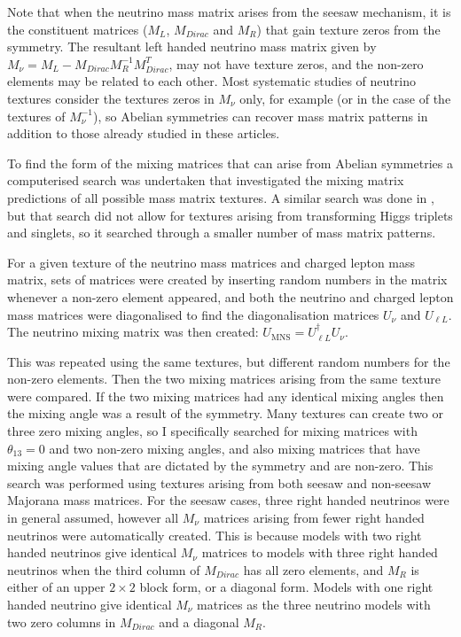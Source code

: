 \documentclass[nofootinbib,showpacs]{revtex4}
\begin{document}
Note that when the neutrino mass matrix arises from the seesaw mechanism, it is the constituent matrices ($M_L$, $M_{Dirac}$ and $M_R$) that gain texture zeros from the symmetry. The resultant left handed neutrino mass matrix given by $M_\nu=M_L-M_{Dirac} M_R^{-1}M_{Dirac}^T$, may not have texture zeros, and the non-zero elements may be related to each other. Most systematic studies of neutrino textures consider the textures zeros in $M_\nu$ only, for example \cite{xingtext1,xingtext2,bandotext1,bandotext2}(or in the case of \cite{lavtext} the textures of $M_\nu^{-1}$), so Abelian symmetries can recover mass matrix patterns in addition to those already studied in these articles. 


To find the form of the mixing matrices that can arise from Abelian symmetries a computerised search was undertaken that investigated the mixing matrix predictions of all possible mass matrix textures. A similar search was done in \cite{nogo2}, but that search did not allow for textures arising from transforming Higgs triplets and singlets, so it searched through a smaller number of mass matrix patterns.

For a given texture of the neutrino mass matrices and charged lepton mass matrix, sets of matrices were created by inserting random numbers in the matrix whenever a non-zero element appeared, and both the neutrino and charged lepton mass matrices were diagonalised to find the diagonalisation matrices $U_\nu$ and $U_{\ell L}$. 
The neutrino mixing matrix was then created: $U_{\mathrm{MNS}}=U^\dagger_{\ell L} U_\nu$. 

This was repeated using the same textures, but different random numbers for the non-zero elements. Then the two mixing matrices arising from the same texture were compared. If the two mixing matrices had any identical mixing angles then the mixing angle was a result of the symmetry. Many textures can create two or three zero mixing angles, so I specifically searched for mixing matrices with $\theta_{13}=0$ and two non-zero mixing angles, and also mixing matrices that have mixing angle values that are dictated by the symmetry and are non-zero.
This search was performed using textures arising from both seesaw and non-seesaw Majorana mass matrices. For the seesaw cases, three right handed neutrinos were in general assumed,
however all $M_\nu$ matrices arising from fewer right handed neutrinos were automatically created. This is because models with two right handed neutrinos give identical $M_\nu$ matrices to models with three right handed neutrinos when the third column of $M_{Dirac}$ has all zero elements, and $M_R$ is either of an upper $2 \times 2$ block form, or a diagonal form. Models with one right handed neutrino give identical $M_\nu$ matrices as the three neutrino models with two zero columns in $M_{Dirac}$ and a diagonal $M_R$.
\end{document}
